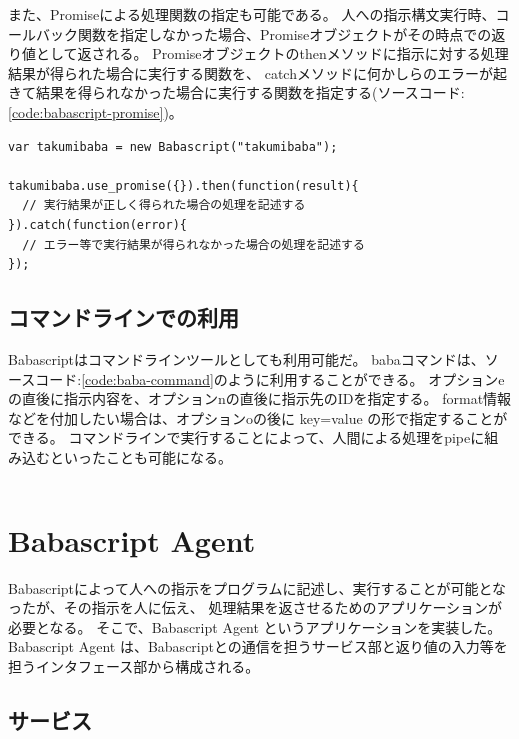 また、Promiseによる処理関数の指定も可能である。
人への指示構文実行時、コールバック関数を指定しなかった場合、Promiseオブジェクトがその時点での返り値として返される。
Promiseオブジェクトのthenメソッドに指示に対する処理結果が得られた場合に実行する関数を、
catchメソッドに何かしらのエラーが起きて結果を得られなかった場合に実行する関数を指定する(ソースコード:\ref{code:babascript-promise})。

\begin{lstlisting}[caption=Promiseによる関数指定, label=code:babascript-promise]
var takumibaba = new Babascript("takumibaba");

takumibaba.use_promise({}).then(function(result){
  // 実行結果が正しく得られた場合の処理を記述する
}).catch(function(error){
  // エラー等で実行結果が得られなかった場合の処理を記述する
});
\end{lstlisting}

\subsection{コマンドラインでの利用}\label{ux30b3ux30deux30f3ux30c9ux30e9ux30a4ux30f3ux3067ux306eux5229ux7528}

Babascriptはコマンドラインツールとしても利用可能だ。
babaコマンドは、ソースコード:\ref{code:baba-command}のように利用することができる。
オプションeの直後に指示内容を、オプションnの直後に指示先のIDを指定する。
format情報などを付加したい場合は、オプションoの後に key=value
の形で指定することができる。
コマンドラインで実行することによって、人間による処理をpipeに組み込むといったことも可能になる。

\begin{lstlisting}[caption=Babaコマンド, label=code:baba-command]
% baba -e hogefuga -o format=boolean
\end{lstlisting}

\section{Babascript Agent}\label{babascript-agent}

Babascriptによって人への指示をプログラムに記述し、実行することが可能となったが、その指示を人に伝え、
処理結果を返させるためのアプリケーションが必要となる。
そこで、Babascript Agent というアプリケーションを実装した。 Babascript
Agent
は、Babascriptとの通信を担うサービス部と返り値の入力等を担うインタフェース部から構成される。

\subsection{サービス}\label{ux30b5ux30fcux30d3ux30b9}

